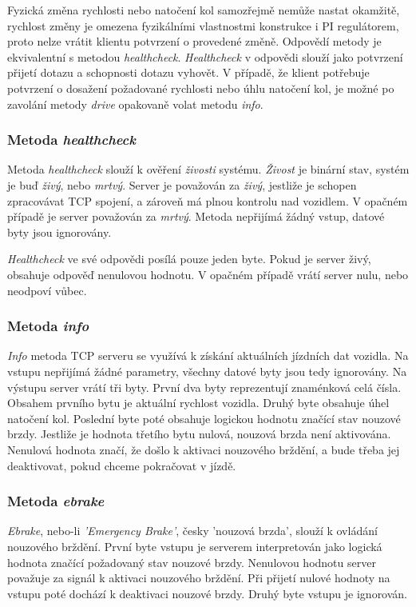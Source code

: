\documentclass[czech,bachelor,dept460,male,cpp,cpdeclaration]{diploma}
\begin{document}
Fyzická změna rychlosti nebo natočení kol samozřejmě nemůže nastat okamžitě, rychlost změny je omezena fyzikálními vlastnostmi 
konstrukce i PI regulátorem, proto nelze vrátit klientu potvrzení o provedené změně. Odpovědí metody je ekvivalentní s metodou 
\emph{healthcheck}. \emph{Healthcheck} v odpovědi slouží jako potvrzení přijetí dotazu a schopnosti dotazu vyhovět. V případě, 
že klient potřebuje potvrzení o dosažení požadované rychlosti nebo úhlu natočení kol, je možné po zavolání metody \emph{drive} 
opakovaně volat metodu \emph{info}.

\subsubsection{Metoda \emph{healthcheck}}
Metoda \emph{healthcheck} slouží k ověření \emph{živosti} systému. \emph{Živost} je binární stav, systém je buď \emph{živý}, nebo
\emph{mrtvý}. Server je považován za \emph{živý}, jestliže je schopen zpracovávat TCP spojení, a zároveň má plnou kontrolu 
nad vozidlem. V opačném případě je server považován za \emph{mrtvý}. Metoda nepřijímá žádný vstup, datové byty jsou ignorovány.

\emph{Healthcheck} ve své odpovědi posílá pouze jeden byte. Pokud je server živý, obsahuje odpověď nenulovou hodnotu. V opačném
případě vrátí server nulu, nebo neodpoví vůbec.

\subsubsection{Metoda \emph{info}}
\emph{Info} metoda TCP serveru se využívá k získání aktuálních jízdních dat vozidla. Na vstupu nepřijímá žádné parametry, všechny
datové byty jsou tedy ignorovány. Na výstupu server vrátí tři byty. První dva byty reprezentují znaménková celá čísla. Obsahem
prvního bytu je aktuální rychlost vozidla. Druhý byte obsahuje úhel natočení kol. Poslední byte poté obsahuje logickou hodnotu
značící stav nouzové brzdy. Jestliže je hodnota třetího bytu nulová, nouzová brzda není aktivována. Nenulová hodnota značí, 
že došlo k aktivaci nouzového brždění, a bude třeba jej deaktivovat, pokud chceme pokračovat v jízdě.

\subsubsection{Metoda \emph{ebrake}}
\emph{Ebrake}, nebo-li \emph{'Emergency Brake'}, česky 'nouzová brzda', slouží k ovládání nouzového brždění. První byte vstupu
je serverem interpretován jako logická hodnota značící požadovaný stav nouzové brzdy. Nenulovou hodnotu server považuje za signál
k aktivaci nouzového brždění. Při přijetí nulové hodnoty na vstupu poté dochází k deaktivaci nouzové brzdy. Druhý byte vstupu 
je ignorován.
\end{document}
